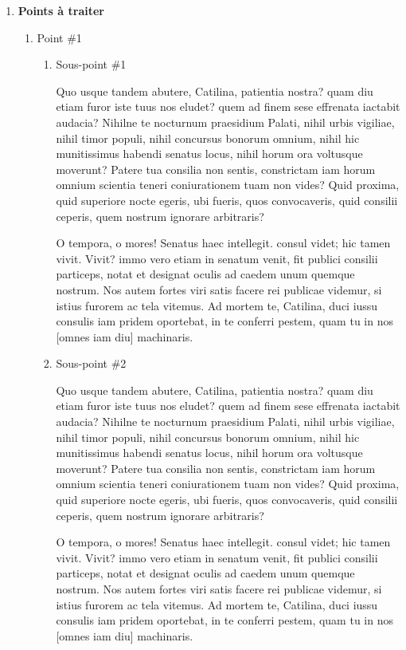 \documentclass[12pt]{ULojpv}
\begin{document}
\begin{enumerate}
\begin{enumerate}
\end{enumerate}


\item \textbf{Points à traiter}

\begin{enumerate}

\item Point \#1

\begin{enumerate}

\item Sous-point \#1

Quo usque tandem abutere, Catilina, patientia nostra? quam diu etiam furor iste tuus nos eludet? quem ad finem sese effrenata iactabit audacia? Nihilne te nocturnum praesidium Palati, nihil urbis vigiliae, nihil timor populi, nihil concursus bonorum omnium, nihil hic munitissimus habendi senatus locus, nihil horum ora voltusque moverunt? Patere tua consilia non sentis, constrictam iam horum omnium scientia teneri coniurationem tuam non vides? Quid proxima, quid superiore nocte egeris, ubi fueris, quos convocaveris, quid consilii ceperis, quem nostrum ignorare arbitraris?

O tempora, o mores! Senatus haec intellegit. consul videt; hic tamen vivit. Vivit? immo vero etiam in senatum venit, fit publici consilii particeps, notat et designat oculis ad caedem unum quemque nostrum. Nos autem fortes viri satis facere rei publicae videmur, si istius furorem ac tela vitemus. Ad mortem te, Catilina, duci iussu consulis iam pridem oportebat, in te conferri pestem, quam tu in nos [omnes iam diu] machinaris.


\item Sous-point \#2

Quo usque tandem abutere, Catilina, patientia nostra? quam diu etiam furor iste tuus nos eludet? quem ad finem sese effrenata iactabit audacia? Nihilne te nocturnum praesidium Palati, nihil urbis vigiliae, nihil timor populi, nihil concursus bonorum omnium, nihil hic munitissimus habendi senatus locus, nihil horum ora voltusque moverunt? Patere tua consilia non sentis, constrictam iam horum omnium scientia teneri coniurationem tuam non vides? Quid proxima, quid superiore nocte egeris, ubi fueris, quos convocaveris, quid consilii ceperis, quem nostrum ignorare arbitraris?

O tempora, o mores! Senatus haec intellegit. consul videt; hic tamen vivit. Vivit? immo vero etiam in senatum venit, fit publici consilii particeps, notat et designat oculis ad caedem unum quemque nostrum. Nos autem fortes viri satis facere rei publicae videmur, si istius furorem ac tela vitemus. Ad mortem te, Catilina, duci iussu consulis iam pridem oportebat, in te conferri pestem, quam tu in nos [omnes iam diu] machinaris.


\end{enumerate}
\end{enumerate}
\end{enumerate}
\end{document}
